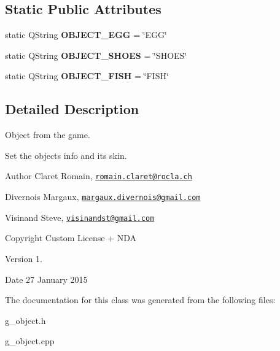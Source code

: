 \subsection*{Static Public Attributes}
\begin{DoxyCompactItemize}
\item 
\hypertarget{class_g___object_a344799eeecb55a83dff4a702a436fb11}{}static Q\+String {\bfseries O\+B\+J\+E\+C\+T\+\_\+\+E\+G\+G} = \char`\"{}E\+G\+G\char`\"{}\label{class_g___object_a344799eeecb55a83dff4a702a436fb11}

\item 
\hypertarget{class_g___object_a68157168b2f8d3a11f5c9b82c3cdb0ac}{}static Q\+String {\bfseries O\+B\+J\+E\+C\+T\+\_\+\+S\+H\+O\+E\+S} = \char`\"{}S\+H\+O\+E\+S\char`\"{}\label{class_g___object_a68157168b2f8d3a11f5c9b82c3cdb0ac}

\item 
\hypertarget{class_g___object_ab0fce0005ab160a146a72f62f4f17ac3}{}static Q\+String {\bfseries O\+B\+J\+E\+C\+T\+\_\+\+F\+I\+S\+H} = \char`\"{}F\+I\+S\+H\char`\"{}\label{class_g___object_ab0fce0005ab160a146a72f62f4f17ac3}

\end{DoxyCompactItemize}


\subsection{Detailed Description}
Object from the game. 

Set the object\textquotesingle{}s info and its skin. \begin{DoxyAuthor}{Author}
Claret Romain, \href{mailto:romain.claret@rocla.ch}{\tt romain.\+claret@rocla.\+ch} 

Divernois Margaux, \href{mailto:margaux.divernois@gmail.com}{\tt margaux.\+divernois@gmail.\+com} 

Visinand Steve, \href{mailto:visinandst@gmail.com}{\tt visinandst@gmail.\+com} 
\end{DoxyAuthor}
\begin{DoxyCopyright}{Copyright}
Custom License + N\+D\+A 
\end{DoxyCopyright}
\begin{DoxyVersion}{Version}
1. 
\end{DoxyVersion}
\begin{DoxyDate}{Date}
27 January 2015 
\end{DoxyDate}


The documentation for this class was generated from the following files\+:\begin{DoxyCompactItemize}
\item 
g\+\_\+object.\+h\item 
g\+\_\+object.\+cpp\end{DoxyCompactItemize}
